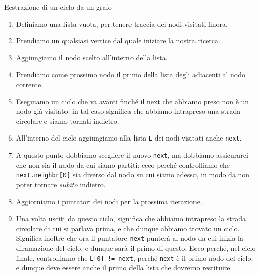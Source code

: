 \documentclass[12pt]{report}
\begin{document}
	\begin{algoritmo}{Eestrazione di un ciclo da un grafo}{}
		\begin{enumerate}
			\item Definiamo una lista vuota, per tenere traccia dei nodi visitati finora.
			
			\item Prendiamo un qualsiasi vertice dal quale iniziare la nostra ricerca.
			
			\item Aggiungiamo il nodo scelto all'interno della lista.
			
			\item Prendiamo come prossimo nodo il primo della lista degli adiacenti al nodo corrente.
			
			\item Eseguiamo un ciclo che va avanti finché il next che abbiamo preso non è un nodo già visitato: in tal caso significa che abbiamo intrapreso una strada circolare e siamo tornati indietro.
			
			\item All'interno del ciclo aggiungiamo alla lista \texttt{L} dei nodi visitati anche \texttt{next}.
			
			\item A questo punto dobbiamo scegliere il nuovo \texttt{next}, ma dobbiamo assicurarci che non sia il nodo da cui siamo partiti: ecco perché controlliamo che \texttt{next.neighbr[0]} sia diverso dal nodo su cui siamo adesso, in modo da non poter tornare \textit{subito} indietro.
			
			\item Aggiorniamo i puntatori dei nodi per la prossima iterazione.
			
			\item Una volta usciti da questo ciclo, significa che abbiamo intrapreso la strada circolare di cui si parlava prima, e che dunque abbiamo trovato un ciclo. Significa inoltre che ora il puntatore \texttt{next} punterà al nodo da cui inizia la diramazione del ciclo, e dunque sarà il primo di questo. Ecco perché, nel ciclo finale, controlliamo che \texttt{L[0] != next}, perché \texttt{next} è il primo nodo del ciclo, e dunque deve essere anche il primo della lista che dovremo restituire.
		\end{enumerate}
	\end{algoritmo}
	
\end{document}
